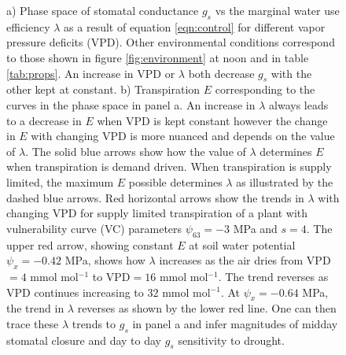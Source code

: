 \documentclass[utf8]{frontiersSCNS} %
\begin{document}
\begin{figure}[h]
    \caption{a) Phase space of stomatal conductance $g_s$ vs the marginal water use efficiency $\lambda$ as a result of equation \ref{eqn:control} for different vapor pressure deficits (VPD). Other environmental conditions correspond to those shown in figure \ref{fig:environment} at noon and in table \ref{tab:props}. An increase in VPD or $\lambda$ both decrease $g_s$ with the other kept at constant. b) Transpiration $E$ corresponding to the curves in the phase space in panel a. An increase in $\lambda$ always leads to a decrease in $E$ when VPD is kept constant however the change in $E$ with changing VPD is more nuanced and depends on the value of $\lambda$. The solid blue arrows show how the value of $\lambda$ determines $E$ when transpiration is demand driven. When transpiration is supply limited, the maximum $E$ possible determines $\lambda$ as illustrated by the dashed blue arrows. Red horizontal arrows show the trends in $\lambda$ with changing VPD for supply limited transpiration of a plant with vulnerability curve (VC) parameters $\psi_{63}=-3$ MPa and $s=4$. The upper red arrow, showing constant $E$ at soil water potential $\psi_x = -0.42$ MPa, shows how $\lambda$ increases as the air dries from VPD$=4$ mmol mol$^{-1}$ to VPD$=16$ mmol mol$^{-1}$. The trend reverses as VPD continues increasing to $32$ mmol mol$^{-1}$. At $\psi_x = -0.64$ MPa, the trend in $\lambda$ reverses as shown by the lower red line. One can then trace these $\lambda$ trends to $g_s$ in panel a and infer magnitudes of midday stomatal closure and day to day $g_s$ sensitivity to drought.}
    \label{fig:gs_E_lam}
\end{figure}
\end{document}
